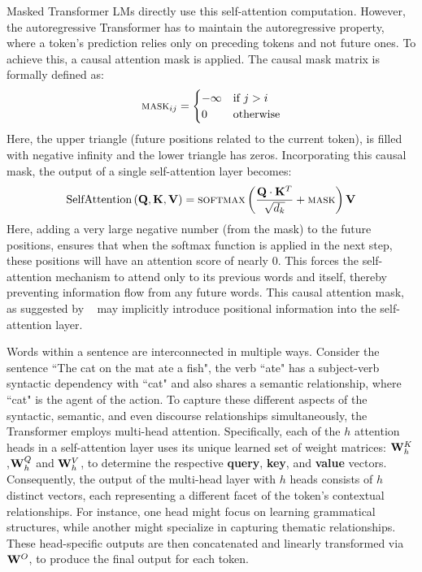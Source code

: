 Masked Transformer LMs directly use this self-attention computation. However, the autoregressive Transformer has to maintain the autoregressive property, where a token's prediction relies only on preceding tokens and not future ones. To achieve this, a causal attention mask is applied. The causal mask matrix is formally defined as:
\begin{equation}
\textsc{mask}_{ij} = \begin{cases}
-\infty & \text{if } j > i \\
 0 & \text{otherwise}
\end{cases}
\end{equation}
\noindent Here, the upper triangle (future positions related to the current token), is filled with negative infinity and the lower triangle has zeros. Incorporating this causal mask, the output of a single self-attention layer becomes:
\begin{equation}
\text{SelfAttention}\left({\mathbf Q},{\mathbf K},{\mathbf V}\right) = \textsc{softmax} \left (\frac{{\mathbf Q} \cdot {\mathbf K}^T}{\sqrt{d_k}} + \textsc{mask} \right ) {\mathbf V}
\end{equation}
\noindent Here, adding a very large negative number (from the mask) to the future positions, ensures that when the softmax function is applied in the next step, these positions will have an attention score of nearly 0. This forces the self-attention mechanism to attend only to its previous words and itself, thereby preventing information flow from any future words. This causal attention mask, as suggested by ~\cite{haviv-etal-2022-transformer} may implicitly introduce positional information into the self-attention layer.


Words within a sentence are interconnected in multiple ways. Consider the sentence ``The cat on the mat ate a fish", the verb ``ate" has a subject-verb syntactic dependency with ``cat" and also shares a semantic relationship, where ``cat" is the agent of the action. %
To capture these different aspects of the syntactic, semantic, and even discourse relationships simultaneously, the Transformer employs multi-head attention. Specifically, each of the $h$ attention heads in a self-attention layer uses its unique learned set of weight matrices: ${\mathbf W}_h^K$,${\mathbf W}_h^Q$ and ${\mathbf W}_h^V$, to determine the respective \textbf{query}, \textbf{key}, and \textbf{value} vectors. Consequently, the output of the multi-head layer with $h$ heads consists of $h$ distinct vectors, each representing a different facet of the token's contextual relationships. For instance, one head might focus on learning grammatical structures, while another might specialize in capturing thematic relationships. These head-specific outputs are then concatenated and linearly transformed via ${\mathbf W}^O$, to produce the final output for each token.

